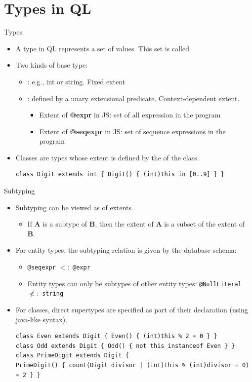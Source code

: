 \documentclass[usenames,dvipsnames]{beamer}
\begin{document}
\section{Types in QL}
\begin{frame}[fragile]{Types}
\begin{itemize}
\item A type in QL represents a set of values. This set is called 
\item Two kinds of base type:
	\begin{itemize}
		\item {}: e.g., int or string. Fixed extent
		\item {}: defined by a unary extensional predicate. Context-dependent extent.
		\begin{itemize}
			\item Extent of \textbf{@expr} in JS: set of all expression in the program
			\item Extent of \textbf{@seqexpr} in JS: set of sequence expressions in the program
		\end{itemize}
	\end{itemize}
\item Classes are types whose extent is defined by the  of the class.
\begin{lstlisting}
class Digit extends int { Digit() { (int)this in [0..9] } }
\end{lstlisting}
\end{itemize}
\end{frame}

\begin{frame}[fragile]{Subtyping}
\begin{itemize}
\item Subtyping can be viewed as  of extents.
\begin{itemize}
\item If \textbf{A} is a subtype of \textbf{B}, then the extent of \textbf{A} is a subset of the extent of \textbf{B}.
\end{itemize}
\item For entity types, the subtyping relation is given by the database schema:
\begin{itemize}
\item \texttt{@seqexpr} $<:$ \texttt{@expr}
\item Entity types can only be subtypes of other entity types: \alert{\texttt{@NullLiteral} $\not<:$ \texttt{string}}
\end{itemize}
\item For classes, direct supertypes are specified as part of their declaration (using java-like syntax).
\begin{lstlisting}[language=JastAdd]
class Even extends Digit { Even() { (int)this % 2 = 0 } }
class Odd extends Digit { Odd() { not this instanceof Even } }
class PrimeDigit extends Digit {
PrimeDigit() { count(Digit divisor | (int)this % (int)divisor = 0) = 2 } }
\end{lstlisting}
\end{itemize}
\end{frame}
\end{document}
